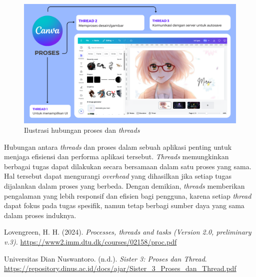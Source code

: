 \documentclass[12pt]{article}
\begin{document}
\begin{enumerate}
\begin{itemize}
        \end{itemize}
    
        \begin{figure}[h]
            \centering
            \includegraphics[width=1\linewidth]{asset/process-and-threads-illustration.png}
            \caption{Ilustrasi hubungan proses dan \textit{threads}}
            \label{fig:ilustrasi-proses-dan-threads}
        \end{figure}
        
    \end{enumerate}
    
    \hspace{1cm}

    Hubungan antara \textit{threads} dan proses dalam sebuah aplikasi penting untuk menjaga efisiensi dan performa aplikasi tersebut. \textit{Threads} memungkinkan berbagai tugas dapat dilakukan secara bersamaan dalam satu proses yang sama. Hal tersebut dapat mengurangi \textit{overhead} yang dihasilkan jika setiap tugas dijalankan dalam proses yang berbeda. Dengan demikian, \textit{threads} memberikan pengalaman yang lebih responsif dan efisien bagi pengguna, karena setiap \textit{thread} dapat fokus pada tugas spesifik, namun tetap berbagi sumber daya yang sama dalam proses induknya.

    \begin{thebibliography}{99}

        Lovengreen, H. H. (2024). \textit{Processes, threads and tasks (Version 2.0, preliminary v.3).} \url{https://www2.imm.dtu.dk/courses/02158/proc.pdf}
        
        Universitas Dian Nuswantoro. (n.d.). \textit{Sister 3: Proses dan Thread}. \url{https://repository.dinus.ac.id/docs/ajar/Sister_3_Proses_dan_Thread.pdf} 
    
    \end{thebibliography}
    
\end{document}
